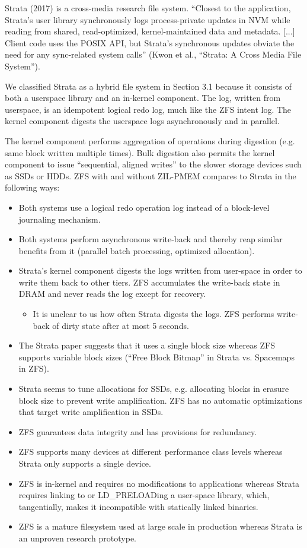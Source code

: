 \documentclass[12pt,a4paper,twoside,draft]{book}
\begin{document}
Strata (2017) is a cross-media research file system.
“Closest to the application, Strata’s user library synchronously logs process-private updates in NVM while reading from shared, read-optimized, kernel-maintained data and metadata. [...] Client code uses the POSIX API, but Strata’s synchronous updates obviate the need for any sync-related system calls” (Kwon et al., “Strata: A Cross Media File System”).

We classified Strata as a hybrid file system in Section 3.1 because it consists of both a userspace library and an in-kernel component.
The log, written from userspace, is an idempotent logical redo log, much like the ZFS intent log. The kernel component digests the userspace logs asynchronously and in parallel.

The kernel component performs aggregation of operations during digestion (e.g. same block written multiple times).
Bulk digestion also permits the kernel component to issue “sequential, aligned writes” to the slower storage devices such as SSDs or HDDs.
ZFS with and without ZIL-PMEM compares to Strata in the following ways:
\begin{itemize}

    \item Both systems use a logical redo operation log instead of a block-level journaling mechanism.
    \item Both systems perform asynchronous write-back and thereby reap similar benefits from it (parallel batch processing, optimized allocation).
    \item Strata’s kernel component digests the logs written from user-space in order to write them back to other tiers. ZFS accumulates the write-back state in DRAM and never reads the log except for recovery.
    \begin{itemize}
        \item It is unclear to us how often Strata digests the logs. ZFS performs write-back of dirty state after at most 5 seconds.
    \end{itemize}
    \item The Strata paper suggests that it uses a single block size whereas ZFS supports variable block sizes (“Free Block Bitmap” in Strata vs. Spacemaps in ZFS).
    \item Strata seems to tune allocations for SSDs, e.g. allocating blocks in erasure block size to prevent write amplification. ZFS has no automatic optimizations that target write amplification in SSDs.
    \item ZFS guarantees data integrity and has provisions for redundancy.
    \item ZFS supports many devices at different performance class levels whereas Strata only supports a single device.
    \item ZFS is in-kernel and requires no modifications to applications whereas Strata requires linking to or LD\_PRELOADing a user-space library, which, tangentially, makes it incompatible with statically linked binaries.
    \item ZFS is a mature filesystem used at large scale in production whereas Strata is an unproven research prototype.
\end{itemize}
\end{document}

